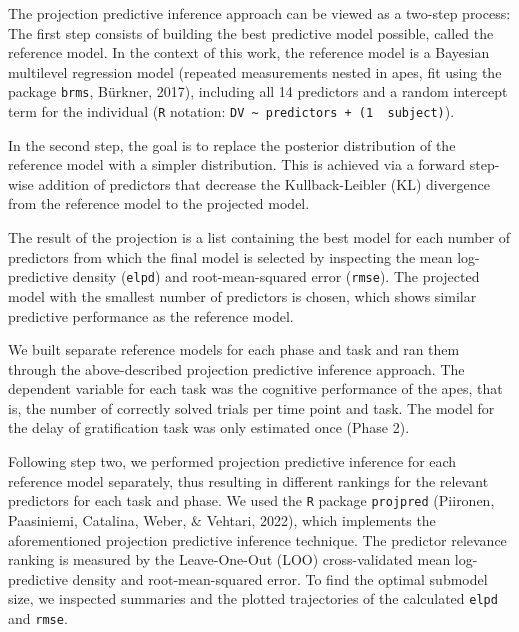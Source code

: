 \documentclass[
  man,floatsintext]{apa6}
\begin{document}
The projection predictive inference approach can be viewed as a two-step process: The first step consists of building the best predictive model possible, called the reference model. In the context of this work, the reference model is a Bayesian multilevel regression model (repeated measurements nested in apes, fit using the package \texttt{brms}, Bürkner, 2017), including all 14 predictors and a random intercept term for the individual (\texttt{R} notation: \texttt{DV\ \textasciitilde{}\ predictors\ +\ (1\ \textbar{}\ subject)}).

In the second step, the goal is to replace the posterior distribution of the reference model with a simpler distribution. This is achieved via a forward step-wise addition of predictors that decrease the Kullback-Leibler (KL) divergence from the reference model to the projected model.

The result of the projection is a list containing the best model for each number of predictors from which the final model is selected by inspecting the mean log-predictive density (\texttt{elpd}) and root-mean-squared error (\texttt{rmse}). The projected model with the smallest number of predictors is chosen, which shows similar predictive performance as the reference model.

We built separate reference models for each phase and task and ran them through the above-described projection predictive inference approach. The dependent variable for each task was the cognitive performance of the apes, that is, the number of correctly solved trials per time point and task. The model for the delay of gratification task was only estimated once (Phase 2).

Following step two, we performed projection predictive inference for each reference model separately, thus resulting in different rankings for the relevant predictors for each task and phase. We used the \texttt{R} package \texttt{projpred} (Piironen, Paasiniemi, Catalina, Weber, \& Vehtari, 2022), which implements the aforementioned projection predictive inference technique. The predictor relevance ranking is measured by the Leave-One-Out (LOO) cross-validated mean log-predictive density and root-mean-squared error. To find the optimal submodel size, we inspected summaries and the plotted trajectories of the calculated \texttt{elpd} and \texttt{rmse}.
\end{document}
